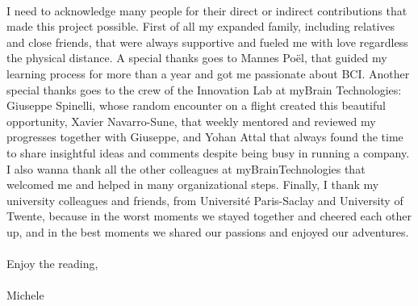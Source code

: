 \\
I need to acknowledge many people for their direct or indirect contributions that made this project possible. First of all my expanded family, including relatives and close friends, that were always supportive and fueled me with love regardless the physical distance. A special thanks goes to Mannes Poël, that guided my learning process for more than a year and got me passionate about BCI. Another special thanks goes to the crew of the Innovation Lab at myBrain Technologies: Giuseppe Spinelli, whose random encounter on a flight created this beautiful opportunity, Xavier Navarro-Sune, that weekly mentored and reviewed my progresses together with Giuseppe, and Yohan Attal that always found the time to share insightful ideas and comments despite being busy in running a company. I also wanna thank all the other colleagues  at myBrainTechnologies that welcomed me and helped in many organizational steps. Finally, I thank my university colleagues and friends, from Université Paris-Saclay and University of Twente, because in the worst moments we stayed together and cheered each other up, and in the best moments we shared our passions and enjoyed our adventures. 
\\
\\
Enjoy the reading,
\\
\\
Michele







